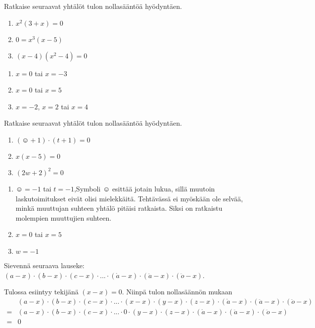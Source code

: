 \begin{tehtava}
    Ratkaise seuraavat yhtälöt tulon nollasääntöä hyödyntäen.
    \begin{enumerate}
        \item $x^2(3+x)=0$
        \item $0=x^3(x-5)$
        \item $(x-4)(x^2-4)=0$
    \end{enumerate}
    \begin{vastaus}
        \begin{enumerate}
            \item $x=0$ tai $x=-3$
            \item $x=0$ tai $x=5$
            \item $x=-2$, $x=2$ tai $x=4$
        \end{enumerate}
    \end{vastaus}
\end{tehtava}


\begin{tehtava}
    Ratkaise seuraavat yhtälöt tulon nollasääntöä hyödyntäen.
    \begin{enumerate}
        \item $(\smiley{}+1)\cdot (t+1)=0$
        \item $x(x-5)=0$
        \item $(2w+2)^2=0$
    \end{enumerate}
    \begin{vastaus}
        \begin{enumerate}
            \item $\smiley{}=-1$ tai $t=-1$,\qquad  Symboli $\smiley{}$ esittää jotain lukua, sillä muutoin laskutoimitukset eivät olisi mielekkäitä. Tehtävässä ei myöskään ole selvää, minkä muuttujan suhteen yhtälö pitäisi ratkaista. Siksi on ratkaistu molempien muuttujien suhteen.
            \item $x=0$ tai $x=5$
            \item $w=-1$
        \end{enumerate}
    \end{vastaus}
\end{tehtava}

\begin{tehtava}
	Sievennä seuraava lauseke: $(a-x)\cdot(b-x)\cdot(c-x)\cdot...\cdot(\mathring{a}-x)\cdot(\ddot{a}-x)\cdot(\ddot{o}-x)$.
    \begin{vastaus}
		Tulossa esiintyy tekijänä $(x-x)=0$. Niinpä tulon nollasäännön mukaan
		\begin{align*}
 			&(a-x)\cdot(b-x)\cdot(c-x)\cdot...\cdot(x-x)\cdot(y-x)\cdot(z-x)\cdot(\mathring{a}-x)\cdot(\ddot{a}-x)\cdot(\ddot{o}-x) \\
 			=&(a-x)\cdot(b-x)\cdot(c-x)\cdot...\cdot 0\cdot(y-x)\cdot(z-x)\cdot(\mathring{a}-x)\cdot(\ddot{a}-x)\cdot(\ddot{o}-x) \\
 			=&0
		\end{align*}
   \end{vastaus}
\end{tehtava}
